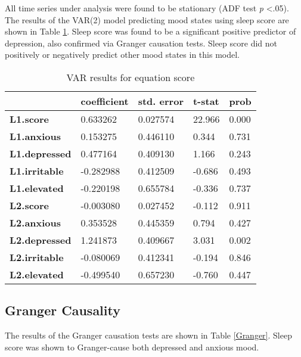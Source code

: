 \documentclass{article}
\begin{document}
All time series under analysis were found to be stationary (ADF test \textit{p}
\textless .05). The results of the VAR(2) model predicting mood states using
sleep score are shown in Table \ref{VARScoreResults}. Sleep score was found to
be a significant positive predictor of depression, also confirmed via Granger
causation tests. Sleep score did not positively or negatively predict other mood
states in this model.

\begin{table}[hb]
    \centering
    \begin{tabular}{lllll}
      \toprule
       ~ & \textbf{coefficient} & \textbf{std. error} & \textbf{t-stat} & \textbf{prob} \\ \midrule
        \textbf{L1.score} & 0.633262 & 0.027574 & 22.966 & 0.000 \\
        \textbf{L1.anxious} & 0.153275 & 0.446110 & 0.344 & 0.731 \\
        \textbf{L1.depressed} & 0.477164 & 0.409130 & 1.166 & 0.243 \\
        \textbf{L1.irritable} & -0.282988 & 0.412509 & -0.686 & 0.493 \\
        \textbf{L1.elevated} & -0.220198 & 0.655784 & -0.336 & 0.737 \\
        \textbf{L2.score} & -0.003080 & 0.027452 & -0.112 & 0.911 \\
        \textbf{L2.anxious} & 0.353528 & 0.445359 & 0.794 & 0.427 \\
        \textbf{L2.depressed} & 1.241873 & 0.409667 & 3.031 & 0.002 \\
        \textbf{L2.irritable} & -0.080069 & 0.412341 & -0.194 & 0.846 \\
        \textbf{L2.elevated} & -0.499540 & 0.657230 & -0.760 & 0.447 \\
        \bottomrule
    \end{tabular}
    \caption{VAR results for equation score}
    \label{VARScoreResults}
\end{table}

\hypertarget{granger-causality-1}{%
\subsection{Granger Causality}\label{granger-causality-1}}

The results of the Granger causation tests are shown in Table \ref{Granger}.
Sleep score was shown to Granger-cause both depressed and anxious mood.
\end{document}
